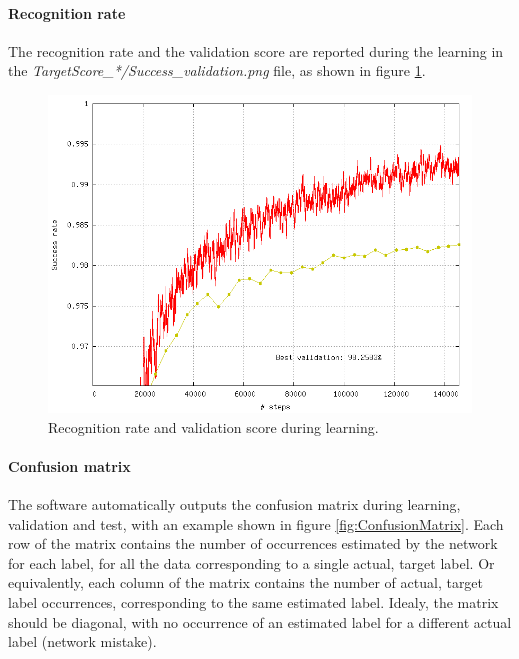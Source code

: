 \documentclass[a4paper,11pt,oneside]{article}
\begin{document}
\paragraph{Recognition rate}

The recognition rate and the validation score are reported during the learning
 in the \emph{TargetScore\_*/Success\_validation.png} file, as shown in
 figure \ref{fig:validationScore}.

\begin{figure}[!htb]
  \centering
  \includegraphics[width=0.8\linewidth]{figs/validation_score.png}
  \caption{Recognition rate and validation score during learning.}
  \label{fig:validationScore}
\end{figure}

\paragraph{Confusion matrix}

The software automatically outputs the confusion matrix during learning,
validation and test, with an example shown in figure \ref{fig:ConfusionMatrix}.
Each row of the matrix contains the number of occurrences estimated by the
 network for each label, for all the data corresponding to a single actual,
 target label.
Or equivalently, each column of the matrix contains the number of actual,
target label occurrences, corresponding to the same estimated label.
Idealy, the matrix should be diagonal, with no occurrence of an estimated
 label for a different actual label (network mistake).
\end{document}
